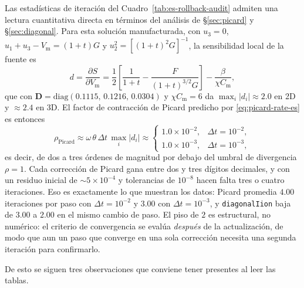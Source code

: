 \documentclass[11pt,a4paper]{article}
\newcommand{\code}[1]{\texttt{\small #1}}
\newcommand{\Vm}{V_{\text{m}}}
\newcommand{\Dten}{\mathbf{D}}
\begin{document}
Las estadísticas de iteración del Cuadro~\ref{tab:es-rollback-audit} admiten una lectura
cuantitativa directa en términos del análisis de \S\ref{sec:picard} y \S\ref{sec:diagonal}.
Para esta solución manufacturada, con $u_3=0$, $u_1+u_3-\Vm=(1+t)G$ y
$u_2^2=[(1+t)^2G]^{-1}$, la sensibilidad local de la fuente es
\begin{equation}
  d=\frac{\partial S}{\partial \Vm}
  =
  \frac{1}{2}\left[\frac{1}{1+t}-\frac{F}{(1+t)^{3/2}G}\right]
  -\frac{\beta}{\chi C_{\text{m}}},
  \label{eq:es-d-analitico}
\end{equation}
que con $\Dten=\mathrm{diag}(0.1115,\,0.1216,\,0.0304)$ y $\chi C_{\text{m}}=6$ da
$\max_i|d_i|\approx 2.0$ en 2D y $\approx 2.4$ en 3D. El factor de contracción de Picard
predicho por \eqref{eq:picard-rate-es} es entonces
\begin{equation}
  \rho_{\text{Picard}}\approx\omega\,\theta\,\Delta t\,\max_i|d_i|
  \approx
  \begin{cases}
    1.0\times10^{-2}, & \Delta t=10^{-2},\\
    1.0\times10^{-3}, & \Delta t=10^{-3},
  \end{cases}
  \label{eq:es-rho-numerico}
\end{equation}
es decir, de dos a tres órdenes de magnitud por debajo del umbral de divergencia
$\rho=1$. Cada corrección de Picard gana entre dos y tres dígitos decimales, y con un residuo
inicial de $\sim\!5\times10^{-4}$ y tolerancias de $10^{-8}$ hacen falta tres o cuatro
iteraciones. Eso es exactamente lo que muestran los datos: Picard promedia $4.00$ iteraciones
por paso con $\Delta t=10^{-2}$ y $3.00$ con $\Delta t=10^{-3}$, y \code{diagonalIion} baja de
$3.00$ a $2.00$ en el mismo cambio de paso. El piso de $2$ es estructural, no numérico: el
criterio de convergencia se evalúa \emph{después} de la actualización, de modo que aun un
paso que converge en una sola corrección necesita una segunda iteración para confirmarlo.

De esto se siguen tres observaciones que conviene tener presentes al leer las tablas.
\end{document}
